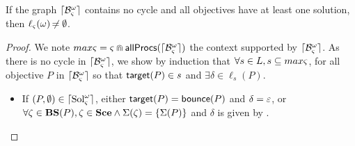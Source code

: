\def\muconcr{\ell}
\def\uconcr{\muconcr_\ctx}

\begin{theorem}\label{th:approxinf}
If the graph $\lceil \mathcal{B}_\varsigma^\omega\rceil$ contains no cycle and all objectives have at least one solution, then $\uconcr(\w) \neq \emptyset$.
\end{theorem}

\begin{proof}
We note $max\varsigma = \varsigma \Cap \mathsf{allProcs}(\lceil \mathcal{B}_\varsigma^\omega\rceil)$ the context supported by $\lceil \mathcal{B}_\varsigma^\omega\rceil$.
As there is no cycle in $\lceil \mathcal{B}_\varsigma^\omega\rceil$, we show by induction that $\forall s\in L, s\subseteq max\varsigma$, 
for all objective $P$ in $\lceil \mathcal{B}_\varsigma^\omega\rceil$ so that $\mathsf{target}(P) \in s$ and
$\exists \delta \in \muconcr_s(P)$.%

\begin{itemize}
  \item If $(P, \emptyset) \in \lceil \mathrm{Sol}^\omega_\varsigma\rceil$, either $\mathsf{target}(P) = \mathsf{bounce}(P)$ and $\delta = \varepsilon$,
    or $\forall \zeta \in \mathbf{BS}(P), \zeta \in \mathbf{Sce} \wedge \Sigma(\zeta) = \{ \Sigma(P) \}$ and $\delta$ is given by .


\end{itemize}
\end{proof}
